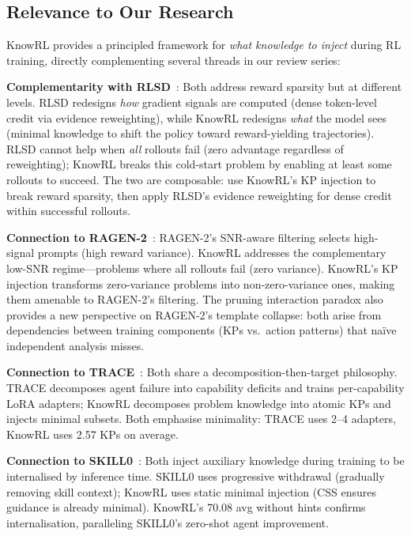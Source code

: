 \documentclass[11pt]{article}
\begin{document}
\subsection{Relevance to Our Research}

KnowRL provides a principled framework for \textit{what knowledge to inject} during RL training, directly complementing several threads in our review series:

\textbf{Complementarity with RLSD}~\cite{rlsd}: Both address reward sparsity but at different levels. RLSD redesigns \textit{how} gradient signals are computed (dense token-level credit via evidence reweighting), while KnowRL redesigns \textit{what} the model sees (minimal knowledge to shift the policy toward reward-yielding trajectories). RLSD cannot help when \textit{all} rollouts fail (zero advantage regardless of reweighting); KnowRL breaks this cold-start problem by enabling at least some rollouts to succeed. The two are composable: use KnowRL's KP injection to break reward sparsity, then apply RLSD's evidence reweighting for dense credit within successful rollouts.

\textbf{Connection to RAGEN-2}~\cite{ragen2}: RAGEN-2's SNR-aware filtering selects high-signal prompts (high reward variance). KnowRL addresses the complementary low-SNR regime---problems where all rollouts fail (zero variance). KnowRL's KP injection transforms zero-variance problems into non-zero-variance ones, making them amenable to RAGEN-2's filtering. The pruning interaction paradox also provides a new perspective on RAGEN-2's template collapse: both arise from dependencies between training components (KPs vs.\ action patterns) that na\"ive independent analysis misses.

\textbf{Connection to TRACE}~\cite{trace}: Both share a decomposition-then-target philosophy. TRACE decomposes agent failure into capability deficits and trains per-capability LoRA adapters; KnowRL decomposes problem knowledge into atomic KPs and injects minimal subsets. Both emphasise minimality: TRACE uses 2--4 adapters, KnowRL uses 2.57 KPs on average.

\textbf{Connection to SKILL0}~\cite{skill0}: Both inject auxiliary knowledge during training to be internalised by inference time. SKILL0 uses progressive withdrawal (gradually removing skill context); KnowRL uses static minimal injection (CSS ensures guidance is already minimal). KnowRL's 70.08 avg without hints confirms internalisation, paralleling SKILL0's zero-shot agent improvement.
\end{document}
